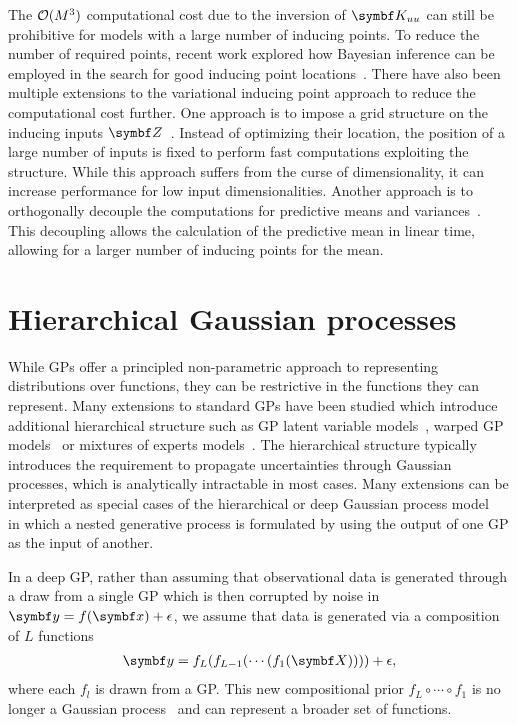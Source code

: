 The $\operatorname{\mathcal{O}}(M^3)$ computational cost due to the inversion of $\mat{K_{uu}}$ can still be prohibitive for models with a large number of inducing points.
To reduce the number of required points, recent work explored how Bayesian inference can be employed in the search for good inducing point locations~\parencite{hensman_mcmc_2015,rossi_rethinking_2020}.
There have also been multiple extensions to the variational inducing point approach to reduce the computational cost further.
One approach is to impose a grid structure on the inducing inputs $\mat{Z}$~\parencite{wilson_kernel_2015}.
Instead of optimizing their location, the position of a large number of inputs is fixed to perform fast computations exploiting the structure.
While this approach suffers from the curse of dimensionality, it can increase performance for low input dimensionalities.
Another approach is to orthogonally decouple the computations for predictive means and variances~\parencite{shi_sparse_2020,salimbeni_orthogonally_2018,cheng_variational_2017}.
This decoupling allows the calculation of the predictive mean in linear time, allowing for a larger number of inducing points for the mean.


\section{Hierarchical Gaussian processes}
\label{toc:dgp}
While GPs offer a principled non-parametric approach to representing distributions over functions, they can be restrictive in the functions they can represent.
Many extensions to standard GPs have been studied which introduce additional hierarchical structure such as GP latent variable models~\parencite{titsias_bayesian_2010,damianou_variational_2014}, warped GP models~\parencite{snelson_warped_2004,lazaro-gredilla_bayesian_2012} or mixtures of experts models~\parencite{tresp_mixtures_2001,rasmussen_infinite_2002,lazaro-gredilla_overlapping_2012}.
The hierarchical structure typically introduces the requirement to propagate uncertainties through Gaussian processes, which is analytically intractable in most cases.
Many extensions can be interpreted as special cases of the hierarchical or deep Gaussian process model~\parencite{lawrence_hierarchical_2007,damianou_deep_2013,damianou_deep_2015} in which a nested generative process is formulated by using the output of one GP as the input of another.

In a deep GP, rather than assuming that observational data is generated through a draw from a single GP which is then corrupted by noise in $\mat{y} = f(\mat{x}) + \epsilon$, we assume that data is generated via a composition of $L$ functions
\begin{equation}
    \begin{split}
        \mat{y} = f_L(f_{L-1}(\cdots(f_1(\mat{X})))) + \epsilon,
    \end{split}
\end{equation}
where each $f_l$ is drawn from a GP.
This new compositional prior $f_L \circ \cdots \circ f_1$ is no longer a Gaussian process~\parencite{duvenaud_avoiding_2014} and can represent a broader set of functions.

